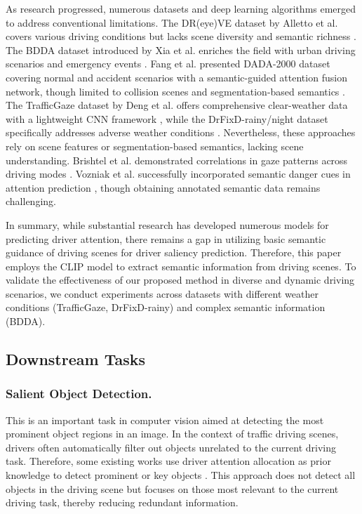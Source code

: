 As research progressed, numerous datasets and deep learning algorithms emerged to address conventional limitations. The DR(eye)VE dataset by Alletto et al. covers various driving conditions but lacks scene diversity and semantic richness \cite{alletto2016dr}. The BDDA dataset introduced by Xia et al. enriches the field with urban driving scenarios and emergency events \cite{xia2019predicting}. Fang et al. presented DADA-2000 dataset covering normal and accident scenarios with a semantic-guided attention fusion network, though limited to collision scenes and segmentation-based semantics \cite{fang2019dada}. The TrafficGaze dataset by Deng et al. offers comprehensive clear-weather data with a lightweight CNN framework \cite{deng2019drivers}, while the DrFixD-rainy/night dataset specifically addresses adverse weather conditions \cite{tian2022driving,deng2023driving}. Nevertheless, these approaches rely on scene features or segmentation-based semantics, lacking scene understanding. Brishtel et al. demonstrated correlations in gaze patterns across driving modes \cite{9945234}. Vozniak et al. successfully incorporated semantic danger cues in attention prediction \cite{vozniak2023context}, though obtaining annotated semantic data remains challenging.

In summary, while substantial research has developed numerous models for predicting driver attention, there remains a gap in utilizing basic semantic guidance of driving scenes for driver saliency prediction. Therefore, this paper employs the CLIP \cite{radford2021learningtransferablevisualmodels} model to extract semantic information from driving scenes. To validate the effectiveness of our proposed method in diverse and dynamic driving scenarios, we conduct experiments across datasets with different weather conditions (TrafficGaze, DrFixD-rainy) and complex semantic information (BDDA).

\subsection{Downstream Tasks}
\subsubsection{Salient Object Detection.} This is an important task in computer vision aimed at detecting the most prominent object regions in an image. In the context of traffic driving scenes, drivers often automatically filter out objects unrelated to the current driving task. Therefore, some existing works use driver attention allocation as prior knowledge to detect prominent or key objects \cite{qin2022id,shi2023fixated}. This approach does not detect all objects in the driving scene but focuses on those most relevant to the current driving task, thereby reducing redundant information.
